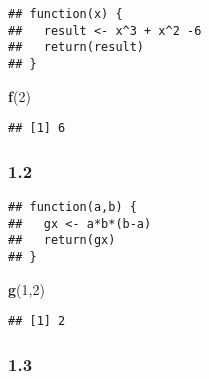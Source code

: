 \documentclass[
]{article}
\newenvironment{Shaded}{\begin{snugshade}}{\end{snugshade}}
\newcommand{\CommentTok}[1]{\textcolor[rgb]{0.56,0.35,0.01}{\textit{#1}}}
\newcommand{\ControlFlowTok}[1]{\textcolor[rgb]{0.13,0.29,0.53}{\textbf{#1}}}
\newcommand{\DecValTok}[1]{\textcolor[rgb]{0.00,0.00,0.81}{#1}}
\newcommand{\KeywordTok}[1]{\textcolor[rgb]{0.13,0.29,0.53}{\textbf{#1}}}
\newcommand{\NormalTok}[1]{#1}
\newcommand{\OperatorTok}[1]{\textcolor[rgb]{0.81,0.36,0.00}{\textbf{#1}}}
\newcommand{\StringTok}[1]{\textcolor[rgb]{0.31,0.60,0.02}{#1}}
\begin{document}
\begin{verbatim}
## function(x) {
##   result <- x^3 + x^2 -6
##   return(result)
## }
\end{verbatim}

\begin{Shaded}
\begin{Highlighting}[]
\KeywordTok{f}\NormalTok{(}\DecValTok{2}\NormalTok{)}
\end{Highlighting}
\end{Shaded}

\begin{verbatim}
## [1] 6
\end{verbatim}

\hypertarget{section-1}{%
\subsubsection{1.2}\label{section-1}}

\begin{Shaded}
\end{Shaded}

\begin{verbatim}
## function(a,b) {
##   gx <- a*b*(b-a)
##   return(gx)
## }
\end{verbatim}

\begin{Shaded}
\begin{Highlighting}[]
\KeywordTok{g}\NormalTok{(}\DecValTok{1}\NormalTok{,}\DecValTok{2}\NormalTok{)}
\end{Highlighting}
\end{Shaded}

\begin{verbatim}
## [1] 2
\end{verbatim}

\hypertarget{section-2}{%
\subsubsection{1.3}\label{section-2}}

\begin{Shaded}
\end{Shaded}
\end{document}
